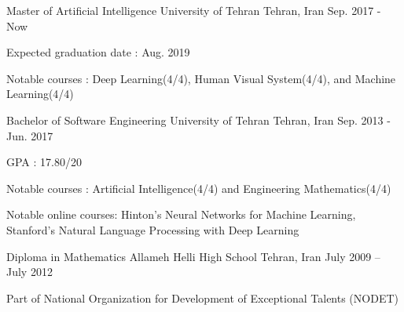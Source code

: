 

\begin{cventries}
  
  \cventry
    {Master of Artificial Intelligence} %
    {University of Tehran} %
    {Tehran, Iran} %
    {Sep. 2017 - Now} %
    {
      \begin{cvitems} %
        \item {Expected graduation date : Aug. 2019}
        \item {Notable courses : Deep Learning(4/4), Human Visual System(4/4), and Machine Learning(4/4)}
      \end{cvitems}
    }
  \cventry
    {Bachelor of Software Engineering} %
    {University of Tehran} %
    {Tehran, Iran} %
    {Sep. 2013 - Jun. 2017} %
    {
      \begin{cvitems} %
        \item {GPA : 17.80/20}
        \item {Notable courses : Artificial Intelligence(4/4) and Engineering Mathematics(4/4)}
        \item {Notable online courses: Hinton's Neural Networks for Machine Learning, Stanford's Natural Language Processing with Deep Learning}
      \end{cvitems}
    }
    
  \cventry
  	{Diploma in Mathematics}
  	{Allameh Helli High School}
  	{Tehran, Iran}
  	{July 2009 – July 2012}
  	{
      \begin{cvitems} %
        \item {Part of National Organization for Development of Exceptional Talents (NODET)}
      \end{cvitems}
    }

\end{cventries}

